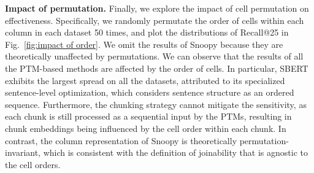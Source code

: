  



\noindent \textbf{Impact of permutation.} Finally, we explore the impact of cell permutation on effectiveness. Specifically, we randomly permutate the order of cells within each column in each dataset 50 times, and plot the distributions of Recall@25 in Fig.~\ref{fig:impact of order}. We omit the results of \textsf{Snoopy} because 
they are theoretically unaffected by permutations.
We can observe that the results of all the PTM-based methods are affected by the order of cells. In particular, SBERT exhibits the largest spread on all the datasets, attributed to its specialized sentence-level optimization, which considers sentence structure as an ordered sequence. Furthermore, the chunking strategy cannot mitigate the sensitivity, as each chunk is still processed as a sequential input by the PTMs, resulting in chunk embeddings being influenced by the cell order within each chunk.
In contrast, the  column representation of \textsf{Snoopy} is theoretically permutation-invariant, which is consistent with the definition of joinability that is agnostic to the cell orders.


